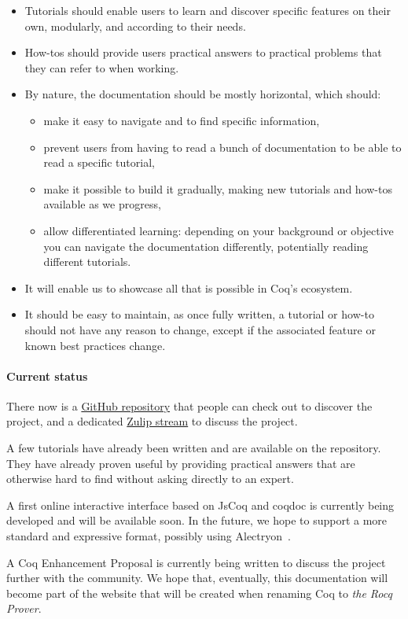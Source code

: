 \documentclass{easychair}
\begin{document}
\begin{itemize}[itemsep=0pt]
  \item Tutorials should enable users to learn and discover specific features on
        their own, modularly, and according to their needs.
  \item How-tos should provide users practical answers to practical problems
        that they can refer to when working.
  \item By nature, the documentation should be mostly horizontal, which should:
    \begin{itemize}[itemsep=0pt]
      \item make it easy to navigate and to find specific information,
      \item prevent users from having to read a bunch of documentation to be
	    able to read a specific tutorial,
      \item make it possible to build it gradually, making new tutorials and
	    how-tos available as we progress,
      \item allow differentiated learning: depending on your background or
            objective you can navigate the documentation differently,
            potentially reading different tutorials.
    \end{itemize}
  \item It will enable us to showcase all that is possible in Coq's ecosystem.
  \item It should be easy to maintain, as once fully written, a tutorial or how-to
        should not have any reason to change, except if the associated feature or
        known best practices change.
\end{itemize}

\paragraph{Current status}

There now is a \href{https://github.com/Zimmi48/platform-docs}{GitHub repository}
that people can check out to discover the project, and a dedicated
\href{https://coq.zulipchat.com/#narrow/stream/437203-Platform-docs}{Zulip stream}
to discuss the project.

A few tutorials have already been written and are available on the repository.
They have already proven useful by providing practical answers that are
otherwise hard to find without asking directly to an expert.

A first online interactive interface based on JsCoq and coqdoc is currently
being developed and will be available soon.
In the future, we hope to support a more standard and expressive format,
possibly using Alectryon~\cite{pit2020untangling}.

A Coq Enhancement Proposal is currently being written to discuss the
project further with the community.
We hope that, eventually, this documentation will become part of the website that will be created when renaming Coq to \emph{the Rocq Prover}.

\label{sect:bib}


\end{document}
